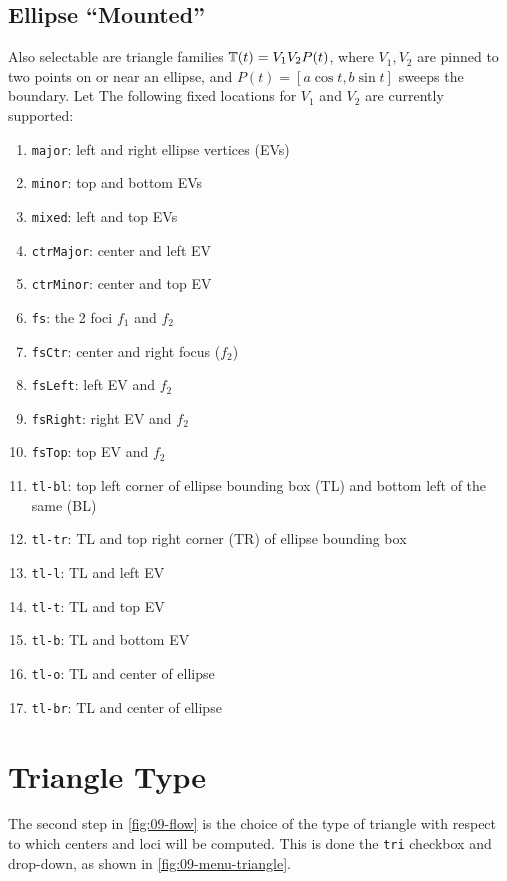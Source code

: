 \subsection{Ellipse ``Mounted''}

Also selectable are triangle families $\mathbb{T}(t)=V_1 V_2 P(t)$, where $V_1,V_2$ are pinned to two points on or near an ellipse, and $P(t)=[a\cos{t},b\sin{t}]$ sweeps the boundary. Let The following fixed locations for $V_1$ and $V_2$ are currently supported:

\begin{enumerate}
    \item \texttt{major}: left and right ellipse vertices (EVs)
    \item \texttt{minor}: top and bottom EVs
    \item \texttt{mixed}: left and top EVs
    \item \texttt{ctrMajor}: center and left EV
    \item \texttt{ctrMinor}: center and top EV 
    \item \texttt{fs}: the 2 foci $f_1$ and $f_2$
    \item \texttt{fsCtr}: center and right focus ($f_2$)
    \item \texttt{fsLeft}: left EV and $f_2$
    \item \texttt{fsRight}: right EV and $f_2$
    \item \texttt{fsTop}: top EV and $f_2$
    \item \texttt{tl-bl}: top left corner of ellipse bounding box (TL) and bottom left of the same (BL)
    \item \texttt{tl-tr}: TL and top right corner (TR) of ellipse bounding box
    \item \texttt{tl-l}: TL and left EV
    \item \texttt{tl-t}: TL and top EV
    \item \texttt{tl-b}: TL and bottom EV
    \item \texttt{tl-o}: TL and center of ellipse
    \item \texttt{tl-br}: TL and center of ellipse
\end{enumerate}

\section{Triangle Type}
\label{sec:09-triangle-type}

The second step in \cref{fig:09-flow} is the choice of the type of triangle with respect to which centers and loci will be computed. This is done the \texttt{tri}  checkbox and drop-down, as shown in \cref{fig:09-menu-triangle}.

